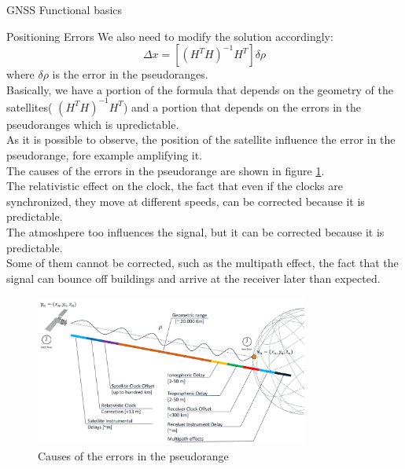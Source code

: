 \begin{section}{GNSS Functional basics}
\begin{section}{Positioning Errors}
      We also need to modify the solution accordingly:
      \begin{equation}
        \Delta x = [(H^TH)^{-1}H^T]\delta \rho
        \label{eq:GNSS least squares error}
      \end{equation}
      where $\delta \rho$ is the error in the pseudoranges.\\
      Basically, we have a portion of the formula that depends on the geometry of the satellites(
      $(H^TH)^{-1}H^T$) and a portion that depends on the errors in the pseudoranges which is
      upredictable.\\
      As it is possible to observe, the position of the satellite influence the error in the pseudorange,
      fore example amplifying it.\\
      
      The causes of the errors in the pseudorange are shown in figure \ref{fig:GNSS errors}.\\
      The relativistic effect on the clock, the fact that even if the clocks are synchronized, they
      move at different speeds, can be corrected because it is predictable.\\
      The atmoshpere too influences the signal, but it can be corrected because it is predictable.\\
      Some of them cannot be corrected, such as the multipath effect, the fact that the signal can
      bounce off buildings and arrive at the receiver later than expected.\\

      \begin{figure}[h]
        \centering
        \includegraphics[width=0.8\textwidth]{img/wireless/GNSS errors.png}
        \caption{Causes of the errors in the pseudorange}
        \label{fig:GNSS errors}
      \end{figure}


\end{section}
\end{section}
